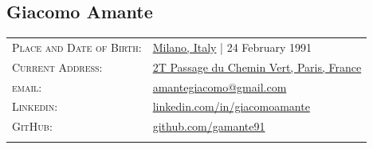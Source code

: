 \documentclass[a4paper,10pt]{article}
\begin{document}
	\pagestyle{empty}

	\begin{minipage}{.65\textwidth}
		\vspace{-5mm}
		\begin{flushleft}
			\section{\Huge Giacomo Amante}	
			\begin{tabular}{ll}
				\textsc{Place and Date of Birth:} & \href{https://www.google.com/maps/place/milano}{Milano, Italy} | 24 February 1991 \\
				\textsc{Current Address:} & \href{https://www.google.it/maps/place/2+Passage+du+Chemin+Vert,+75011+Paris/@48.8597221,2.3725467,17z/data=!3m1!4b1!4m5!3m4!1s0x47e66df96ea289b5:0xdb763fce45ffb863!8m2!3d48.8597221!4d2.3747354}{2T Passage du Chemin Vert, Paris, France}\\
				\textsc{email:} & \href{mailto:amantegiacomo@gmail.com}{amantegiacomo@gmail.com} \\
				\textsc{Linkedin:} & 
				\href{http://www.linkedin.com/in/giacomoamante}{\color{black}linkedin.com/in/giacomoamante}\\
				\textsc{GitHub:} & \href{https://github.com/gamante91}{github.com/gamante91}\\
				\multicolumn{2}{c}{} \\
			\end{tabular}				
		\end{flushleft}
	\end{minipage}%
	\hspace{10mm}%
\end{document}
